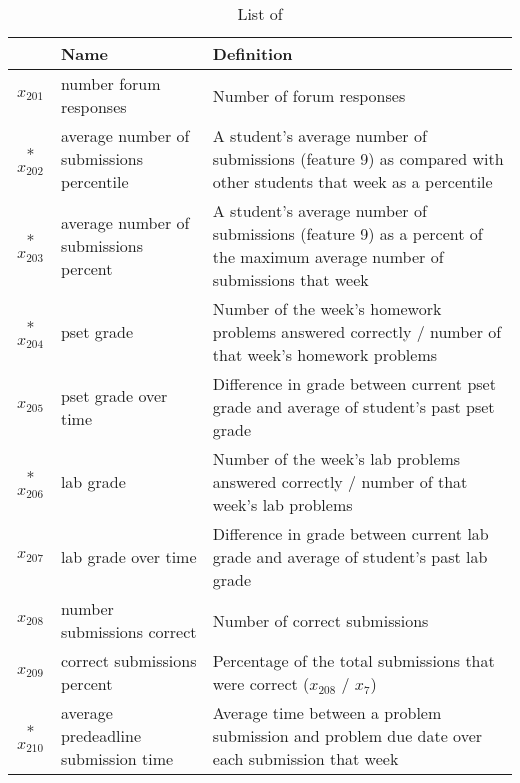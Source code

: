 \begin{table*}[htp]
	\centering
	\caption{List of \crowdself \cov}\label{table:crowd_proposed_self_extracted}
{
		\begin{tabular}{|c|p{4cm}|p{10cm}|}
			\hline
							& Name 													& Definition																									 \\ \hline
			$x_{201}$ & number forum responses			& Number of forum responses																		\\ \hline
			*$x_{202}$ & average number of submissions percentile	& A student's average number of submissions (feature 9) as compared with other students that week as a percentile				\\ \hline
			*$x_{203}$ & average number of submissions percent	& A student's average number of submissions (feature 9) as a percent of the maximum average number of submissions that week																																			\\ \hline
			*$x_{204}$ & pset grade										& Number of the week's homework problems answered correctly / number of that week's homework problems																																												\\ \hline
			$x_{205}$ & pset grade over time					& Difference in grade between current pset grade and average of student's past pset grade																																																					\\ \hline
			*$x_{206}$ & lab grade										& Number of the week's lab problems answered correctly / number of that week's lab  problems																																																\\ \hline
			$x_{207}$ & lab grade over time						& Difference in grade between current lab grade and average of student's past lab grade																																																					\\ \hline
			$x_{208}$ & number submissions correct		& Number of correct submissions																\\ \hline
			$x_{209}$ & correct submissions percent		& Percentage of the total submissions that were correct ($x_{208}$ / $x_{7}$)													\\ \hline
			*$x_{210}$ & average predeadline submission time & Average time between a problem submission and problem due date over each submission that week																																									\\ \hline
		\end{tabular}
	}
\end{table*}